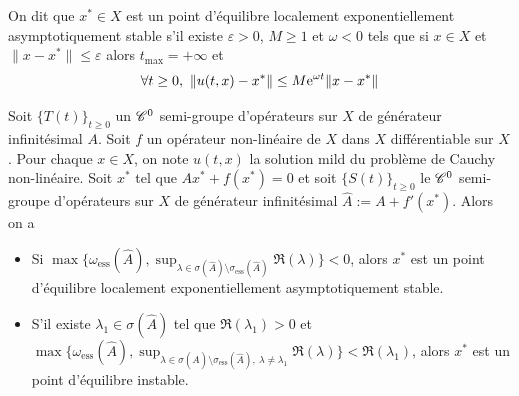 \begin{frame}
    \begin{definition}
        On dit que $x^* \in X$ est un \textcolor{astral}{point d'équilibre localement exponentiellement asymptotiquement stable} s'il existe $\varepsilon >0$, $M \geq 1$ et $\omega <0$ tels que si $x \in X$ et $\|x-x^*\| \leq \varepsilon$ alors $t_{\max}=+\infty$ et 
        \begin{equation*}
            \forall t \geq 0, \ \|u(t,x)-x^*\| \leq M\mathrm{e}^{\omega t}\|x-x^*\|
        \end{equation*}
    \end{definition}
    \pause
    \begin{proposition}
        Soit $\big\{T(t)\big\}_{t \geq 0}$ un $\mathscr{C}^0$ semi-groupe d'opérateurs sur $X$ de générateur infinitésimal $A$. Soit $f$ un opérateur non-linéaire de $X$ dans $X$ différentiable sur $X$. Pour chaque $x \in X$, on note $u(t,x)$ la solution mild du problème de Cauchy non-linéaire. Soit $x^*$ tel que $Ax^*+f(x^*)=0$ et soit $\big\{S(t)\big\}_{t\geq 0}$ le $\mathscr{C}^0$ semi-groupe d'opérateurs sur $X$ de générateur infinitésimal $\hat{A}:=A+f'(x^*)$. Alors on a 
        \begin{itemize}
            \item Si $\max\{\omega_{\text{ess}}(\hat{A}), \displaystyle{\sup_{\lambda \in \sigma(\hat{A})\setminus \sigma_{\text{ess}}(\hat{A})}}\Re(\lambda)\}<0$, alors $x^*$ est un point d'équilibre localement exponentiellement asymptotiquement stable.
            \item S'il existe $\lambda_1 \in \sigma(\hat{A})$ tel que $\Re(\lambda_1) >0$ et $\max\{\omega_{\text{ess}}(\hat{A}), \displaystyle{\sup_{\lambda \in \sigma(\hat{A})\setminus \sigma_{\text{ess}}(\hat{A}), \ \lambda \neq \lambda_1}}\Re(\lambda)\}<\Re(\lambda_1)$, alors $x^*$ est un point d'équilibre instable.
        \end{itemize}
    \end{proposition}
\end{frame}

